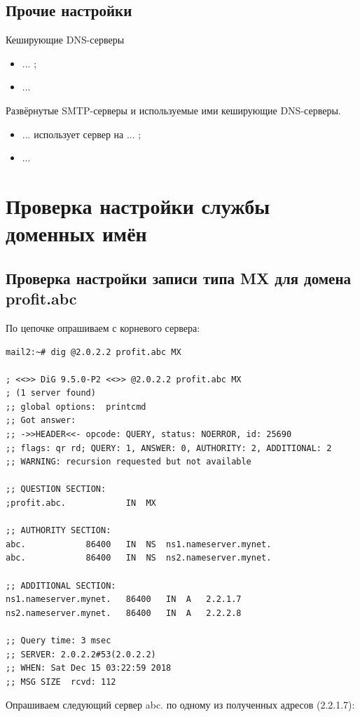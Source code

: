 \documentclass[a4paper,12pt]{article}
\begin{document}
\subsection{Прочие настройки}

Кеширующие DNS-серверы
\begin{itemize}
\item ... ;
\item ...
\end{itemize}

Развёрнутые SMTP-серверы и используемые ими кеширующие DNS-серверы.
\begin{itemize}
\item ... использует сервер на ... ;
\item ...
\end{itemize}


\section{Проверка настройки службы доменных имён}

\subsection{Проверка настройки записи типа MX для домена profit.abc}

По цепочке опрашиваем с корневого сервера:

\begin{verbatim}
mail2:~# dig @2.0.2.2 profit.abc MX

; <<>> DiG 9.5.0-P2 <<>> @2.0.2.2 profit.abc MX
; (1 server found)
;; global options:  printcmd
;; Got answer:
;; ->>HEADER<<- opcode: QUERY, status: NOERROR, id: 25690
;; flags: qr rd; QUERY: 1, ANSWER: 0, AUTHORITY: 2, ADDITIONAL: 2
;; WARNING: recursion requested but not available

;; QUESTION SECTION:
;profit.abc.			IN	MX

;; AUTHORITY SECTION:
abc.			86400	IN	NS	ns1.nameserver.mynet.
abc.			86400	IN	NS	ns2.nameserver.mynet.

;; ADDITIONAL SECTION:
ns1.nameserver.mynet.	86400	IN	A	2.2.1.7
ns2.nameserver.mynet.	86400	IN	A	2.2.2.8

;; Query time: 3 msec
;; SERVER: 2.0.2.2#53(2.0.2.2)
;; WHEN: Sat Dec 15 03:22:59 2018
;; MSG SIZE  rcvd: 112

\end{verbatim}

Опрашиваем следующий сервер abc. по одному из полученных адресов (2.2.1.7):
\end{document}
